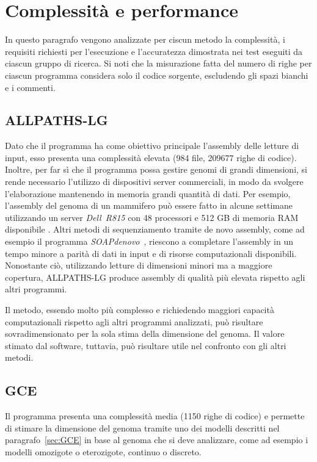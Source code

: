 \documentclass[crop=false, class=book]{standalone}
\begin{document}
	
	\section{Complessità e performance}
	In questo paragrafo vengono analizzate per ciscun metodo la complessità, i requisiti richiesti per l'esecuzione e l'accuratezza dimostrata nei test eseguiti da ciascun gruppo di ricerca. Si noti che la misurazione fatta del numero di righe per ciascun programma considera solo il codice sorgente, escludendo gli spazi bianchi e i commenti.
	
	
	\subsection{ALLPATHS-LG}
	Dato che il programma ha come obiettivo principale l'assembly delle letture di input, esso presenta una complessità elevata (984 file, 209677 righe di codice). Inoltre, per far sì che il programma possa gestire genomi di grandi dimensioni, si rende necessario l'utilizzo di dispositivi server commerciali, in modo da svolgere l'elaborazione mantenendo in memoria grandi quantità di dati. Per esempio, l'assembly del genoma di un mammifero può essere fatto in alcune settimane utilizzando un server \textit{Dell~R815} con 48 processori e 512 GB di memoria RAM disponibile \cite{gnerre2011high}. Altri metodi di sequenziamento tramite de novo assembly, come ad esempio il programma \mbox{\textit{SOAPdenovo}}~\cite{li2010denovo}, riescono a completare l'assembly in un tempo minore a parità di dati in input e di risorse computazionali disponibili. Nonostante ciò, utilizzando letture di dimensioni minori ma a maggiore copertura, ALLPATHS-LG produce assembly di qualità più elevata rispetto agli altri programmi.
	
	Il metodo, essendo molto più complesso e richiedendo maggiori capacità computazionali rispetto agli altri programmi analizzati, può risultare sovradimensionato per la sola stima della dimensione del genoma. Il valore stimato dal software, tuttavia, può risultare utile nel confronto con gli altri metodi.
	
	\subsection{GCE}
	Il programma presenta una complessità media (1150 righe di codice) e permette di stimare la dimensione del genoma tramite uno dei modelli descritti nel paragrafo~\vref{sec:GCE} in base al genoma che si deve analizzare, come ad esempio i modelli omozigote o eterozigote, continuo o discreto.
	
\end{document}
